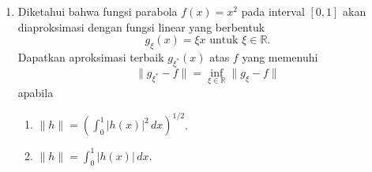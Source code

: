 \documentclass[12pt]{article}
\begin{document}
\begin{enumerate}
            \textbf{Solusi:}
            Kita dapat menggunakan uji integral (atau estimasi sisa deret dengan integral) karena fungsi $f(x) = \frac{1}{(2x-1)^2}$ adalah fungsi yang positif dan monoton turun untuk $x \ge 1$.
            Untuk menaksir sisa jumlahan mulai dari indeks $n = k+2$ hingga tak hingga, kita dapat menaksir dengan integral Riemann berikut:
            $$ \sum_{n=k+2}^\infty \frac{1}{(2n-1)^2} \le \int_{k+1}^\infty \frac{1}{(2x-1)^2} \, dx $$
            Kita hitung nilai integral tak wajar tersebut:
            \begin{align*}
                  \int_{k+1}^\infty (2x-1)^{-2} \, dx & = \lim_{t \to \infty} \left[ -\frac{1}{2}(2x-1)^{-1} \right]_{k+1}^t                            \\
                                                      & = \lim_{t \to \infty} \left( -\frac{1}{2(2t-1)} \right) - \left( -\frac{1}{2(2(k+1)-1)} \right) \\
                                                      & = 0 + \frac{1}{2(2k+1)}                                                                         \\
                                                      & = \frac{1}{4k+2}
            \end{align*}
            Jadi,
            $$ \sum_{n=k+2}^\infty \frac{1}{(2n-1)^2} \le \frac{1}{4k+2}. $$
            Kita dapat menambahkan suku dengan indeks $n = k+1$ ke ruas kiri dan kanan pada persamaan tersebut:
            \begin{align*}
                  \sum_{n=k+1}^\infty \frac{1}{(2n-1)^2} & = \frac{1}{(2(k+1)-1)^2} + \sum_{n=k+2}^\infty \frac{1}{(2n-1)^2} \\
                                                         & \le \frac{1}{(2k+1)^2} + \frac{1}{4k+2}.
            \end{align*}
            Sehingga terbukti bahwa $\sum_{n=k+1}^\infty \frac{1}{(2n-1)^2} \le \frac{1}{4k+2} + \frac{1}{(2k+1)^2}, \quad \forall k \in \mathbb{N}.$

      \item Diketahui bahwa fungsi parabola $f(x) = x^2$ pada interval $[0, 1]$ akan diaproksimasi dengan fungsi linear yang berbentuk
            $$ g_\xi(x) = \xi x \text{ untuk } \xi \in \mathbb{R}. $$
            Dapatkan aproksimasi terbaik $g_{\xi^*}(x)$ atas $f$ yang memenuhi
            $$ \|g_{\xi^*} - f\| = \inf_{\xi \in \mathbb{R}} \|g_\xi - f\| $$
            apabila
            \begin{enumerate}
                  \item $\|h\| = \left( \int_0^1 |h(x)|^2 \, dx \right)^{1/2}$.
                  \item $\|h\| = \int_0^1 |h(x)| \, dx$.
            \end{enumerate}


\end{enumerate}
\end{document}
